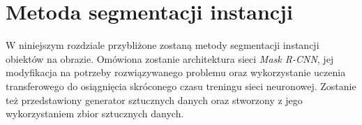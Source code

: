 \chapter{Metoda segmentacji instancji}
W niniejszym rozdziale przybliżone zostaną metody segmentacji instancji obiektów na obrazie.
Omówiona zostanie architektura sieci \textit{Mask R-CNN}, jej modyfikacja na potrzeby rozwiązywanego problemu oraz wykorzystanie uczenia transferowego do osiągnięcia skróconego czasu treningu sieci neuronowej.
Zostanie też przedstawiony generator sztucznych danych oraz stworzony z jego wykorzystaniem zbior sztucznych danych.
